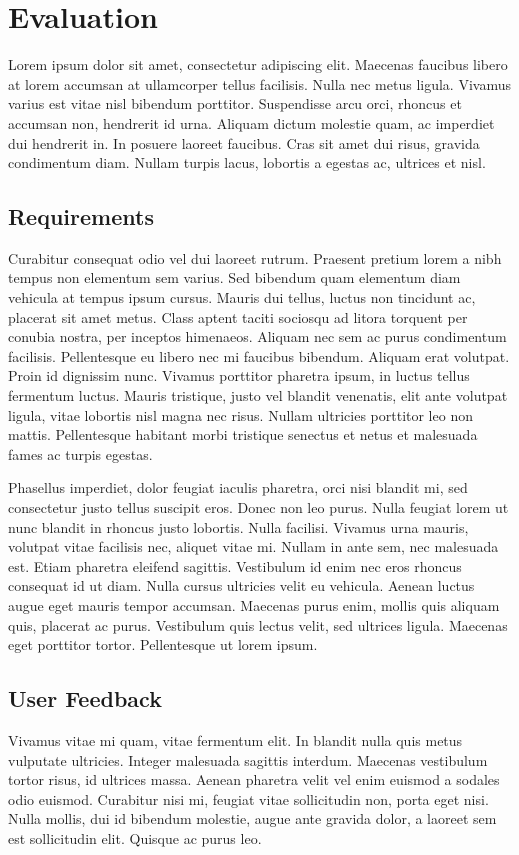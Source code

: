 \chapter{Evaluation}
\label{chap:evaluation}

Lorem ipsum dolor sit amet, consectetur adipiscing elit. Maecenas faucibus libero at lorem accumsan at ullamcorper tellus facilisis. Nulla nec metus ligula. Vivamus varius est vitae nisl bibendum porttitor. Suspendisse arcu orci, rhoncus et accumsan non, hendrerit id urna. Aliquam dictum molestie quam, ac imperdiet dui hendrerit in. In posuere laoreet faucibus. Cras sit amet dui risus, gravida condimentum diam. Nullam turpis lacus, lobortis a egestas ac, ultrices et nisl.


\section{Requirements}
Curabitur consequat odio vel dui laoreet rutrum. Praesent pretium lorem a nibh tempus non elementum sem varius. Sed bibendum quam elementum diam vehicula at tempus ipsum cursus. Mauris dui tellus, luctus non tincidunt ac, placerat sit amet metus. Class aptent taciti sociosqu ad litora torquent per conubia nostra, per inceptos himenaeos. Aliquam nec sem ac purus condimentum facilisis. Pellentesque eu libero nec mi faucibus bibendum. Aliquam erat volutpat. Proin id dignissim nunc. Vivamus porttitor pharetra ipsum, in luctus tellus fermentum luctus. Mauris tristique, justo vel blandit venenatis, elit ante volutpat ligula, vitae lobortis nisl magna nec risus. Nullam ultricies porttitor leo non mattis. Pellentesque habitant morbi tristique senectus et netus et malesuada fames ac turpis egestas.

Phasellus imperdiet, dolor feugiat iaculis pharetra, orci nisi blandit mi, sed consectetur justo tellus suscipit eros. Donec non leo purus. Nulla feugiat lorem ut nunc blandit in rhoncus justo lobortis. Nulla facilisi. Vivamus urna mauris, volutpat vitae facilisis nec, aliquet vitae mi. Nullam in ante sem, nec malesuada est. Etiam pharetra eleifend sagittis. Vestibulum id enim nec eros rhoncus consequat id ut diam. Nulla cursus ultricies velit eu vehicula. Aenean luctus augue eget mauris tempor accumsan. Maecenas purus enim, mollis quis aliquam quis, placerat ac purus. Vestibulum quis lectus velit, sed ultrices ligula. Maecenas eget porttitor tortor. Pellentesque ut lorem ipsum.

\section{User Feedback}
Vivamus vitae mi quam, vitae fermentum elit. In blandit nulla quis metus vulputate ultricies. Integer malesuada sagittis interdum. Maecenas vestibulum tortor risus, id ultrices massa. Aenean pharetra velit vel enim euismod a sodales odio euismod. Curabitur nisi mi, feugiat vitae sollicitudin non, porta eget nisi. Nulla mollis, dui id bibendum molestie, augue ante gravida dolor, a laoreet sem est sollicitudin elit. Quisque ac purus leo.

